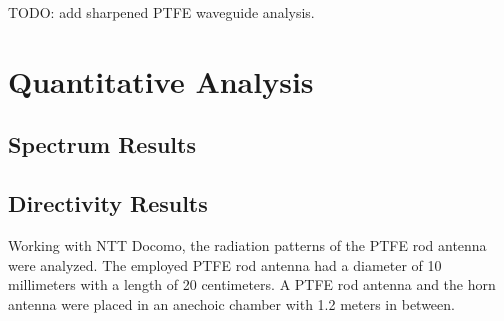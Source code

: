 \documentclass[a4paper,12pt]{report}
\begin{document}
TODO: add sharpened PTFE waveguide analysis.

\section{Quantitative Analysis}

\subsection{Spectrum Results}

\subsection{Directivity Results}

Working with NTT Docomo,
the radiation patterns of the PTFE rod antenna were analyzed.
The employed PTFE rod antenna had a diameter of 10 millimeters
with a length of 20 centimeters.
A PTFE rod antenna and the horn antenna were placed in
an anechoic chamber with 1.2 meters in between.
\end{document}
